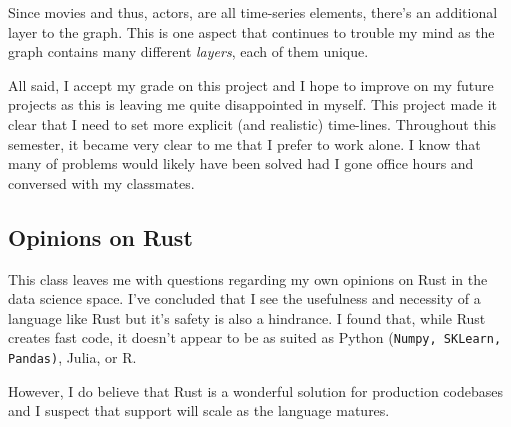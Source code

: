 \documentclass[12pt,letterpaper]{article}
\begin{document}
Since movies and thus, actors, are all time-series elements, there's an additional layer to the graph.  This is one aspect that continues to trouble my mind as the graph contains many different \textit{layers}, each of them unique.  

All said, I accept my grade on this project and I hope to improve on my future projects as this is leaving me quite disappointed in myself.  This project made it clear that I need to set more explicit (and realistic) time-lines.  Throughout this semester, it became very clear to me that I prefer to work alone.  I know that many of problems would likely have been solved had I gone office hours and conversed with my classmates. 

\subsection{Opinions on Rust}
This class leaves me with questions regarding my own opinions on Rust in the data science space. I've concluded that I see the usefulness and necessity of a language like Rust but it's safety is also a hindrance.  I found that, while Rust creates fast code, it doesn't appear to be as suited as Python (\texttt{Numpy, SKLearn, Pandas)}, Julia, or R.  

However, I do believe that Rust is a wonderful solution for production codebases and I suspect that support will scale as the language matures. 
\end{document}
